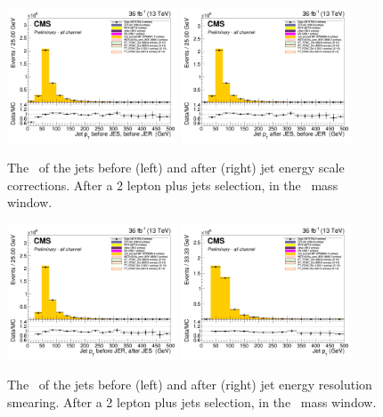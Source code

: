 \begin{figure}[htbp]
	\centering
	\includegraphics[width=0.45\textwidth]{5_Eventselection/Figures/Reweighing/JEC/2lepcontrol_afterAtLeast1Jet_afterZWindow_JetPt_bfJES_all_Stack}
	\includegraphics[width=0.45\textwidth]{5_Eventselection/Figures/Reweighing/JEC/2lepcontrol_afterAtLeast1Jet_afterZWindow_JetPt_afJES_all_Stack}
	\caption{The \pt\ of the jets before (left) and after (right) jet energy scale corrections. After a 2 lepton plus jets selection, in the \PZ\ mass window.}
	\label{fig:jesSF}
\end{figure}

\begin{figure}[htbp]
	\centering
	\includegraphics[width=0.45\textwidth]{5_Eventselection/Figures/Reweighing/JER/2lepcontrol_afterAtLeast1Jet_afterZWindow_JetPt_bfJER_all_Stack}
	\includegraphics[width=0.45\textwidth]{5_Eventselection/Figures/Reweighing/JER/2lepcontrol_afterAtLeast1Jet_afterZWindow_JetPt_afJER_all_Stack}
	\caption{The \pt\ of the jets before (left) and after (right) jet energy resolution smearing. After a 2 lepton plus jets selection, in the \PZ\ mass window.}
	\label{fig:jerSF}
\end{figure}


